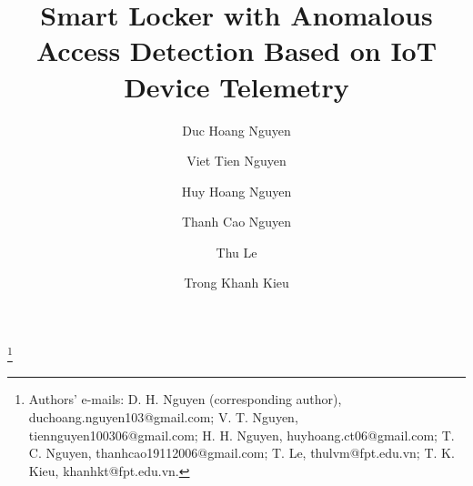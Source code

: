 \documentclass[manuscript,screen]{acmart}
\begin{document}
\title{Smart Locker with Anomalous Access Detection Based on IoT Device Telemetry}

\author{Duc Hoang Nguyen}

\author{Viet Tien Nguyen}

\author{Huy Hoang Nguyen}

\author{Thanh Cao Nguyen}

\author{Thu Le}

\author{Trong Khanh Kieu}

\thanks{Authors' e-mails: D. H. Nguyen (corresponding author), duchoang.nguyen103@gmail.com; V. T. Nguyen,
  tiennguyen100306@gmail.com; H. H. Nguyen, huyhoang.ct06@gmail.com; T. C. Nguyen, thanhcao19112006@gmail.com;
  T. Le, thulvm@fpt.edu.vn; T. K. Kieu, khanhkt@fpt.edu.vn.}

\renewcommand{\shortauthors}{D. H. Nguyen et al.}
\end{document}
